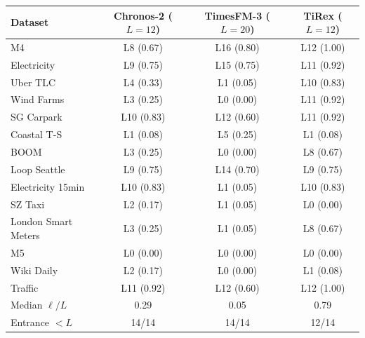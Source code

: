 \begin{tabular}{lccc}
\toprule
Dataset & Chronos-2 ($L{=}12$) & TimesFM-3 ($L{=}20$) & TiRex ($L{=}12$) \\
\midrule
M4 & L8 (0.67) & L16 (0.80) & L12 (1.00) \\
Electricity & L9 (0.75) & L15 (0.75) & L11 (0.92) \\
Uber TLC & L4 (0.33) & L1 (0.05) & L10 (0.83) \\
Wind Farms & L3 (0.25) & L0 (0.00) & L11 (0.92) \\
SG Carpark & L10 (0.83) & L12 (0.60) & L11 (0.92) \\
Coastal T-S & L1 (0.08) & L5 (0.25) & L1 (0.08) \\
BOOM & L3 (0.25) & L0 (0.00) & L8 (0.67) \\
Loop Seattle & L9 (0.75) & L14 (0.70) & L9 (0.75) \\
Electricity 15min & L10 (0.83) & L1 (0.05) & L10 (0.83) \\
SZ Taxi & L2 (0.17) & L1 (0.05) & L0 (0.00) \\
London Smart Meters & L3 (0.25) & L1 (0.05) & L8 (0.67) \\
M5 & L0 (0.00) & L0 (0.00) & L0 (0.00) \\
Wiki Daily & L2 (0.17) & L0 (0.00) & L1 (0.08) \\
Traffic & L11 (0.92) & L12 (0.60) & L12 (1.00) \\
\midrule
Median $\ell/L$ & 0.29 & 0.05 & 0.79 \\
Entrance $<L$ & 14/14 & 14/14 & 12/14 \\
\bottomrule
\end{tabular}
